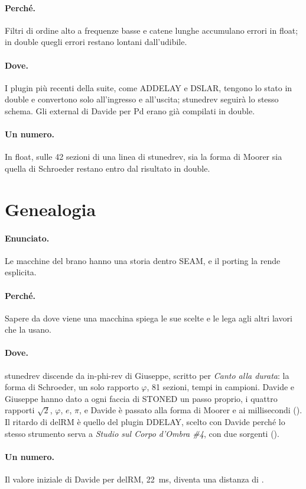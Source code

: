 \paragraph{Perché.}
Filtri di ordine alto a frequenze basse e catene lunghe accumulano errori in float; in double quegli errori restano lontani dall'udibile.

\paragraph{Dove.}
I plugin più recenti della suite, come ADDELAY e DSLAR, tengono lo stato in double e convertono solo all'ingresso e all'uscita; stunedrev seguirà lo stesso schema.
Gli external di Davide per Pd erano già compilati in double.

\paragraph{Un numero.}
In float, sulle 42 sezioni di una linea di stunedrev, sia la forma di Moorer sia quella di Schroeder restano entro  dal risultato in double.

\section{Genealogia}\label{sec:principio-genealogia}
\paragraph{Enunciato.}
Le macchine del brano hanno una storia dentro SEAM, e il porting la rende esplicita.

\paragraph{Perché.}
Sapere da dove viene una macchina spiega le sue scelte e le lega agli altri lavori che la usano.

\paragraph{Dove.}
stunedrev discende da in-phi-rev di Giuseppe, scritto per \emph{Canto alla durata}: la forma di Schroeder, un solo rapporto $\varphi$, 81 sezioni, tempi in campioni.
Davide e Giuseppe hanno dato a ogni faccia di STONED un passo proprio, i quattro rapporti $\sqrt{2}$, $\varphi$, $e$, $\pi$, e Davide è passato alla forma di Moorer e ai millisecondi ().
Il ritardo di delRM è quello del plugin DDELAY, scelto con Davide perché lo stesso strumento serva a \emph{Studio sul Corpo d'Ombra \#4}, con due sorgenti ().

\paragraph{Un numero.}
Il valore iniziale di Davide per delRM, \qty{22}{\milli\second}, diventa una distanza di .

